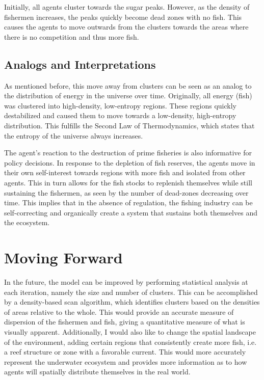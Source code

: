 \documentclass{article}
\begin{document}
Initially, all agents cluster towards the sugar peaks. However, as the density of fishermen increases, the peaks quickly become dead zones with no fish. This causes the agents to move outwards from the clusters towards the areas where there is no competition and thus more fish. 

\subsection{Analogs and Interpretations}
As mentioned before, this move away from clusters can be seen as an analog to the distribution of energy in the universe over time. Originally, all energy (fish) was clustered into high-density, low-entropy regions. These regions quickly destabilized and caused them to move towards a low-density, high-entropy distribution. This fulfills the Second Law of Thermodynamics, which states that the entropy of the universe always increases. \*

The agent's reaction to the destruction of prime fisheries is also informative for policy decisions. In response to the depletion of fish reserves, the agents move in their own self-interest towards regions with more fish and isolated from other agents. This in turn allows for the fish stocks to replenish themselves while still sustaining the fishermen, as seen by the number of dead-zones decreasing over time. This implies that in the absence of regulation, the fishing industry can be self-correcting and organically create a system that sustains both themselves and the ecosystem.

\section{Moving Forward} 
In the future, the model can be improved by performing statistical analysis at each iteration, namely the size and number of clusters. This can be accomplished by a density-based scan algorithm, which identifies clusters based on the densities of areas relative to the whole. This would provide an accurate measure of dispersion of the fishermen and fish, giving a quantitative measure of what is visually apparent. \*
Additionally, I would also like to change the spatial landscape of the environment, adding certain regions that consistently create more fish, i.e. a reef structure or zone with a favorable current. This would more accurately represent the underwater ecosystem and provides more information as to how agents will spatially distribute themselves in the real world.
\end{document}
